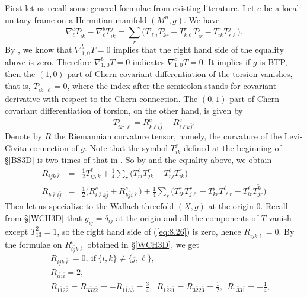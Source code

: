 \documentclass{amsart}
\numberwithin{equation}{section}
\theoremstyle{definition}
\renewcommand{\1}{\mathds{1}}
\renewcommand{\>}{\rightarrow}
\begin{document}
First let us recall some general formulae from existing literature. Let $e$ be a local unitary frame on a Hermitian manifold $(M^n,g)$. We have
$$ \nabla^c_{\ell}T^j_{ik} - \nabla^b_{\ell}T^j_{ik} = \sum_r \big(T^r_{\ell i}T^j_{kr} + T^r_{k\ell}T^j_{ir} - T^r_{ik}T^j_{r\ell} \big). $$
By \cite[Proposition 2.5]{ZhaoZ24}, we know that $\nabla^b_{1,0}T=0$ implies that the right hand side of the equality above is zero. Therefore  $\nabla^b_{1,0}T=0 $ indicates $ \nabla^c_{1,0}T=0$. It implies if $g$ is BTP, then the $(1,0)$-part of Chern covariant differentiation of the torsion vanishes, that is, $T^j_{ik;\ell}=0$, where the index after the semicolon stands for covariant derivative with respect to the Chern connection. The $(0,1)$-part of Chern covariant differentiation of torsion, on the other hand, is given by
$$ T^j_{ik;\overline{\ell}}= R^c_{k\overline{\ell}i\overline{j}} - R^c_{i\overline{\ell}k\overline{j}} .$$
Denote by $R$ the Riemannian curvature tensor, namely, the curvature of the Levi-Civita connection of $g$.
Note that the symbol $T_{ik}^j$ defined at the beginning of \S \ref{BS3D} is two times of that in \cite{YZ18Cur}.
So by \cite[Lemma 7]{YZ18Cur} and the equality above, we obtain
\begin{eqnarray}
R_{ijk\overline{\ell}} & = & \frac{1}{2}T^{\ell}_{ij;k}
+ \frac{1}{4}\sum_r \big( T^{\ell}_{ri}T^r_{jk} - T^{\ell}_{rj}T^r_{ik} \big)    \label{eq:8.26} \\
R_{k\overline{\ell}i\overline{j}} & = & \frac{1}{2}\big( R^c_{i\overline{\ell}k\overline{j}}  +  R^c_{k\overline{j}i\overline{\ell}}  \big)
+ \frac{1}{4}\sum_r \big( T^r_{ik}\overline{T^r_{j\ell } } - T^j_{kr}\overline{T^i_{\ell r} } - T^{\ell}_{ir}\overline{T^k_{jr } } \big) \label{eq:8.27}
\end{eqnarray}
Then let us specialize to the Wallach threefold $(X,g)$ at the origin $0$. Recall from \S \ref{WCH3D} that $g_{i\overline{j}}=\delta_{ij}$ at the origin and all the components of $T$ vanish except $T^2_{13}=1$, so the right hand side of (\ref{eq:8.26}) is zero, hence $R_{ijk\overline{\ell}} =0$. By the formulae on $R^c_{i\overline{j}k\overline{\ell}}$ obtained in \S \ref{WCH3D}, we get
\begin{eqnarray}
&& R_{i\overline{j}k\overline{\ell}}=0,\ \text{if}\ \{ i,k\}\neq \{ j,\ell\}, \\
&& R_{i\overline{i}i\overline{i}}=2, \\
&& R_{1\overline{1}2\overline{2}} = R_{3\overline{3}2\overline{2}} = - R_{1\overline{1}3\overline{3}}  = \frac{3}{4}, \ \
R_{1\overline{2}2\overline{1}} = R_{3\overline{2}2\overline{3}} = \frac{1}{2}, \ \
R_{1\overline{3}3\overline{1}} = - \frac{1}{4},\label{eq:8.28}
\end{eqnarray}
\end{document}
